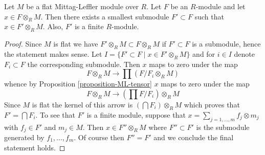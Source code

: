 \begin{lemma}
\label{lemma-minimal-contains}
Let $M$ be a flat Mittag-Leffler module over $R$. Let $F$ be an $R$-module
and let $x \in F \otimes_R M$. Then there exists a smallest submodule
$F' \subset F$ such that $x \in F' \otimes_R M$.
Also, $F'$ is a finite $R$-module.
\end{lemma}

\begin{proof}
Since $M$ is flat we have $F' \otimes_R M \subset F \otimes_R M$
if $F' \subset F$ is a submodule, hence the statement makes sense.
Let $I = \{F' \subset F \mid x \in F' \otimes_R M\}$ and for
$i \in I$ denote $F_i \subset F$ the corresponding submodule.
Then $x$ maps to zero under the map
$$
F \otimes_R M \longrightarrow \prod (F/F_i \otimes_R M)
$$
whence by Proposition \ref{proposition-ML-tensor}
$x$ maps to zero under the map
$$
F \otimes_R M \longrightarrow \left(\prod F/F_i\right) \otimes_R M
$$
Since $M$ is flat the kernel of this arrow is
$(\bigcap F_i) \otimes_R M$ which proves that $F' = \bigcap F_i$.
To see that $F'$ is a finite module, suppose that
$x = \sum_{j = 1, \ldots, m} f_j \otimes m_j$ with $f_j \in F'$
and $m_j \in M$. Then $x \in F'' \otimes_R M$ where $F'' \subset F'$ is
the submodule generated by $f_1, \ldots, f_m$. Of course then
$F'' = F'$ and we conclude the final statement holds.
\end{proof}
